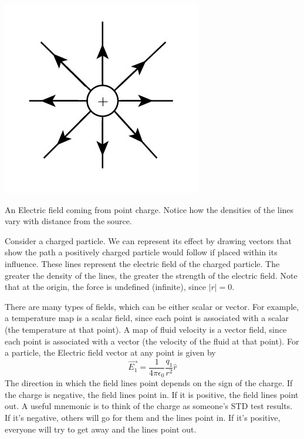 \documentclass[nobib]{tufte-handout}
\begin{document}
\begin{marginfigure}
    \includegraphics{images/electricfieldlines.jpg}
    \caption{An Electric field coming from point charge. 
    Notice how the densities of the lines vary with distance from the source.}
    \label{fig:electric-field-lines-point-charge}
\end{marginfigure}
Consider a charged particle. We can represent its effect
by drawing vectors that show the path a positively charged 
particle would follow if placed within its influence. These lines represent the 
electric field of the charged particle. The greater the density of the lines, the greater 
the strength of the electric field. Note that at the origin, the force is
undefined (infinite), since $|r| = 0$. 

There are many types of fields, which can be either scalar 
or vector. 
For example, a temperature map is a scalar field, since
each point is associated with a scalar (the temperature at that 
point). A map of fluid velocity is a vector field, since each point 
is associated with a vector (the velocity of the fluid at that point).
For a particle, the Electric field vector at any point is given by
\[\vec{E_1} = \frac{1}{4\pi \epsilon_0}\frac{q_1}{r^2}\hat{r}\]
The direction in which the field lines point depends on the 
sign of the charge. If the charge is negative, the field lines point in.
If it is positive, the field lines point out. A useful mnemonic is
to think of the charge as someone's STD test results. If it's negative,
others will go for them and the lines point in. If it's positive, everyone
will try to get away and the lines point out.
\end{document}
